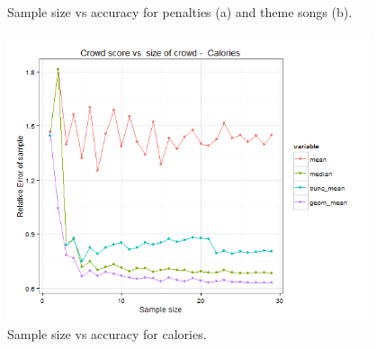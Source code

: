 \documentclass[12pt]{article}
\begin{document}
\begin{figure}[ht!]
     \begin{center}
    \end{center}
    \caption{Sample size vs accuracy for penalties (a) and theme songs (b).}
\end{figure}



\begin{figure}[ht!]
\begin{center}
\includegraphics[width=0.95\textwidth]{../../output/demo_analysis/sample_size_calories.png}
\caption{Sample size vs accuracy for calories.}
\end{center}	
\end{figure}
\end{document}
